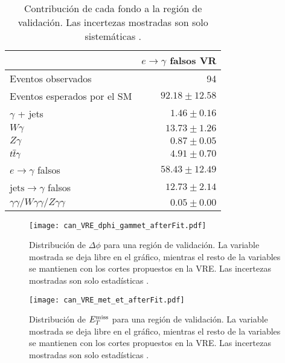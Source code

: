 \begin{table}
\centering
\caption{Contribución de cada fondo a la región de validación. Las incertezas mostradas son solo sistemáticas \cite{drfran}.}
\begin{tabular}{lr}
\hline
 & $e\to\gamma$ falsos VR \\
\hline
Eventos observados & 94 \\
\hline
Eventos esperados por el SM & $92.18 \pm 12.58$ \\
\hline
$\gamma$ + jets & $1.46 \pm 0.16$ \\
$W\gamma$ & $13.73 \pm 1.26$ \\
$Z\gamma$ & $0.87 \pm 0.05$ \\
$t \overline{t}\gamma$ & $4.91 \pm 0.70$ \\
$e\rightarrow\gamma$ falsos & $58.43 \pm 12.49$ \\
$\text{jets}\rightarrow\gamma$ falsos & $12.73 \pm 2.14$ \\
$\gamma\gamma / W\gamma\gamma / Z\gamma\gamma$ & $0.05 \pm 0.00$ \\
\hline
\end{tabular}
\label{ta:vr_events}
\end{table}


\begin{figure}
\centering
\texttt{[image: can\_VRE\_dphi\_gammet\_afterFit.pdf]}
\caption{Distribución de $\Delta \phi$ para una región de validación. La variable mostrada se deja libre en el gráfico, mientras el resto de la variables se mantienen con los cortes propuestos en la VRE. Las incertezas mostradas son solo estadísticas \cite{drfran}.}
\label{VRE_dphi}
\end{figure}

\begin{figure}
\centering
\texttt{[image: can\_VRE\_met\_et\_afterFit.pdf]}
\caption{Distribución de $E_{T}^{\text{miss}}$ para una región de validación. La variable mostrada se deja libre en el gráfico, mientras el resto de la variables se mantienen con los cortes propuestos en la VRE. Las incertezas mostradas son solo estadísticas \cite{drfran}.}
\label{VRE_met_et}
\end{figure}



\clearpage
